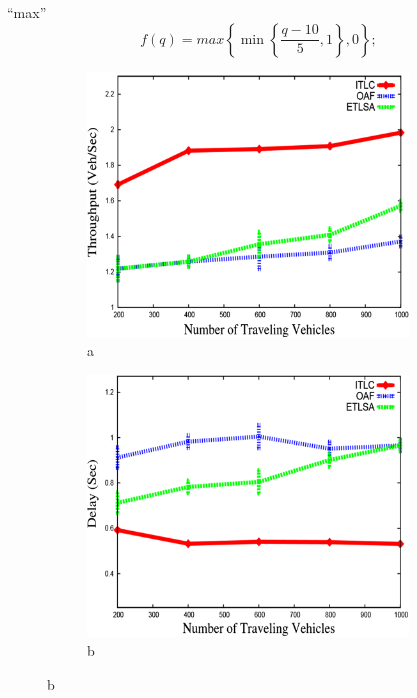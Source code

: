 ``max''
\begin{equation}
f(q) = max\left\{ \min\left\{ \frac{q - 10}{5},1 \right\},0 \right\};
\end{equation}

\begin{figure}[H]
    \centering
    \begin{subfigure}[b]{0.45\textwidth}
        \centering
        \includegraphics[width=\textwidth]{assets/75}
		\caption*{a}
    \end{subfigure}
    \hfill
    \begin{subfigure}[b]{0.45\textwidth}
        \centering
        \includegraphics[width=\textwidth]{assets/75.1}
		\caption*{b}
    \end{subfigure}
\end{figure}


